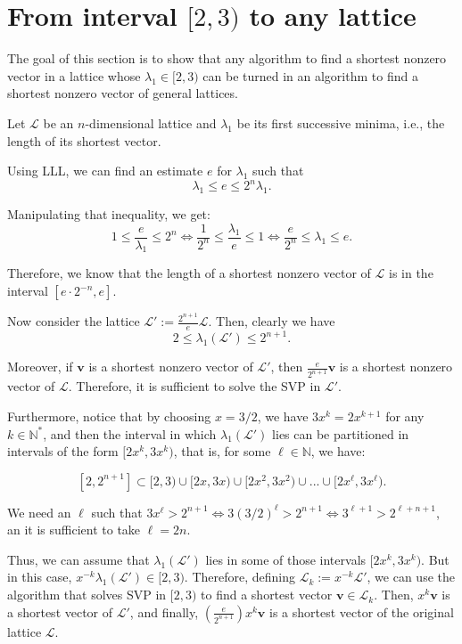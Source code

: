\documentclass[a4paper,11pt]{article}
\newcommand\N{{\mathbb N}}
\let\vec\mathbf %
\theoremstyle{definition}
\theoremstyle{remark}
\begin{document}
\section{From interval $[2, 3)$ to any lattice}
\label{sec:from_2_3_to_general}

The goal of this section is to show that any algorithm to find a shortest 
nonzero vector in a lattice whose $\lambda_1 \in [2, 3)$ can be turned in an 
algorithm to find a shortest nonzero vector of general lattices.

Let $\mathcal{L}$ be an $n$-dimensional lattice and $\lambda_1$ be its first 
successive minima, i.e., the length of its shortest vector.

Using LLL, we can find an estimate $e$ for $\lambda_1$ such that
$$\lambda_1 \le e \le 2^n\lambda_1.$$

Manipulating that inequality, we get:
$$1 \le \frac{e}{\lambda_1} \le 2^n \Leftrightarrow \frac{1}{2^n} \le 
\frac{\lambda_1}{e} \le 1
\Leftrightarrow \frac{e}{2^n} \le \lambda_1 \le e.$$

Therefore, we know that the length of a shortest nonzero vector of 
$\mathcal{L}$ is in the interval $\left[ e\cdot 2^{-n}, e \right]$.

Now consider the lattice $\mathcal{L}' := \frac{2^{n+1}}{e}\mathcal{L}$. Then, 
clearly we have 
$$2 \le \lambda_1\left(\mathcal{L}'\right) \le 2^{n+1}.$$

Moreover, if $\vec v$ is a shortest nonzero vector of $\mathcal{L}'$, then 
$\frac{e}{2^{n+1}} \vec v$ is a shortest nonzero vector of $\mathcal{L}$. 
Therefore, it is sufficient to solve the SVP in $\mathcal{L}'$.

Furthermore, notice that by choosing $x = 3/2$, we have $3x^k = 2x^{k+1}$ for 
any $k \in \N^*$, and then the interval in which 
$\lambda_1\left(\mathcal{L}'\right)$ lies can be partitioned in intervals of 
the form $[2x^k, 3x^k)$, that is, for some $\ell \in \N$, we have:

$$[2, 2^{n+1}] \subset [2, 3) \cup [2x, 3x) \cup [2x^2, 3x^2) \cup ... \cup 
[2x^\ell, 3x^\ell).$$

We need an $\ell$ such that $3x^\ell > 2^{n+1} \Leftrightarrow 3(3/2)^\ell > 
2^{n+1} \Leftrightarrow 3^{\ell+1} > 2^{\ell + n+1}$, an it is 
sufficient to take $\ell = 2n$.

Thus, we can assume that $\lambda_1(\mathcal{L}')$ lies in some of those 
intervals $[2x^k, 3x^k)$. But in this case, $x^{-k}\lambda_1(\mathcal{L}') \in 
[2, 3)$. Therefore, defining $\mathcal{L}_k := x^{-k}\mathcal{L}'$, we can use 
the algorithm that solves SVP in $[2, 3)$ to find a shortest vector $\vec v \in 
\mathcal{L}_k$. Then, $x^k\vec v$ is a shortest vector of $\mathcal{L}'$, and 
finally, $\left(\frac{e}{2^{n+1}}\right)x^k\vec v$ is a shortest vector of the 
original lattice $\mathcal{L}$.
\end{document}
